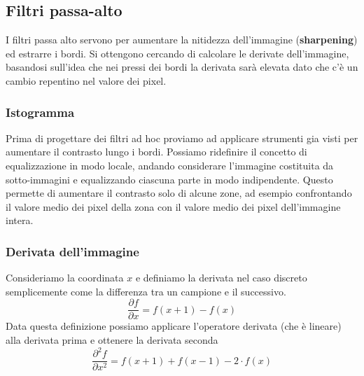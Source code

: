 \subsection{Filtri passa-alto}
I filtri passa alto servono per aumentare la nitidezza dell'immagine (\textbf{sharpening}) ed estrarre i bordi. Si ottengono cercando di calcolare le derivate dell'immagine, basandosi sull'idea che nei pressi dei bordi la derivata sarà elevata dato che c'è un cambio repentino nel valore dei pixel.
\subsubsection{Istogramma}
Prima di progettare dei filtri ad hoc proviamo ad applicare strumenti gia visti per aumentare il contrasto lungo i bordi. Possiamo ridefinire il concetto di equalizzazione in modo locale, andando considerare l'immagine costituita da sotto-immagini e equalizzando ciascuna parte in modo indipendente. Questo permette di aumentare il contrasto solo di alcune zone, ad esempio confrontando il valore medio dei pixel della zona con il valore medio dei pixel dell'immagine intera.
\subsubsection{Derivata dell'immagine}
Consideriamo la coordinata $x$ e definiamo la derivata nel caso discreto semplicemente come la differenza tra un campione e il successivo.
\begin{equation}
	\frac{\partial f}{\partial x} = f(x+1) - f(x)
\end{equation}
Data questa definizione possiamo applicare l'operatore derivata (che è lineare) alla derivata prima e ottenere la derivata seconda
\begin{equation}
	\frac{\partial^2 f}{\partial x^2} = f(x+1) + f(x-1) - 2 \cdot f(x)
\end{equation}
